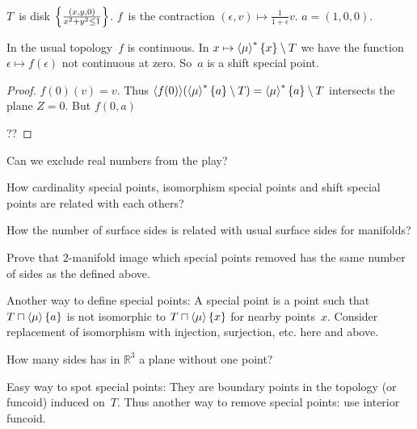\begin{example}
$T$~is disk $\left\{ \frac{(x,y,0)}{x^2+y^2\leq 1}\right\}$. $f$~is the contraction
$(\epsilon,v)\mapsto\frac{1}{1+\epsilon}v$. $a=(1,0,0)$.

In the usual topology~$f$ is continuous. In
$x\mapsto\left\langle \mu\right\rangle ^{\ast}\{x\}\setminus T$ we have the function
$\epsilon\mapsto f(\epsilon)$ not continuous at zero.
So~$a$ is a shift special point.
\end{example}

\begin{proof}
$f (0) (v) = v$. Thus $\langle f (0) \rangle (\left\langle \mu\right\rangle ^{\ast} \{ a
\} \setminus T) = \left\langle \mu\right\rangle ^{\ast} \{ a \} \setminus T$ intersects
the plane $Z = 0$. But $f (0, a)$

??
\end{proof}

\begin{question}
Can we exclude real numbers from the play?
\end{question}

\begin{question}
How cardinality special points, isomorphism special points and shift
special points are related with each others?
\end{question}

\begin{question}
How the number of surface sides is related with usual surface sides for
manifolds?
\end{question}

Prove that $2$-manifold image which special points removed has the same number
of sides as the defined above.

Another way to define special points: A special point is a point
such that $T\sqcap\left\langle \mu\right\rangle\{a\}$ is not isomorphic to
$T\sqcap\left\langle \mu\right\rangle\{x\}$ for nearby points~$x$. Consider replacement
of isomorphism with injection, surjection, etc. here and above.

How many sides has in $\mathbb{R}^3$ a plane without one point?

Easy way to spot special points: They are boundary points in the
topology (or funcoid) induced on~$T$. Thus another way to remove
special points: use interior funcoid.
